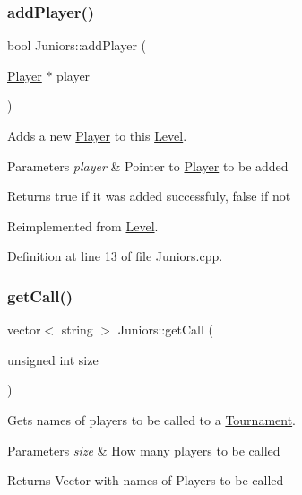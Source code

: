 \subsubsection{\texorpdfstring{add\+Player()}{addPlayer()}}
{\footnotesize\ttfamily bool Juniors\+::add\+Player (\begin{DoxyParamCaption}\item[{\hyperlink{class_player}{Player} $\ast$}]{player }\end{DoxyParamCaption})\hspace{0.3cm}{\ttfamily [virtual]}}



Adds a new \hyperlink{class_player}{Player} to this \hyperlink{class_level}{Level}. 


\begin{DoxyParams}{Parameters}
{\em player} & Pointer to \hyperlink{class_player}{Player} to be added \\
\hline
\end{DoxyParams}
\begin{DoxyReturn}{Returns}
true if it was added successfuly, false if not 
\end{DoxyReturn}


Reimplemented from \hyperlink{class_level_a66290778fa4bcd2f29b9ff3e605b2902}{Level}.



Definition at line 13 of file Juniors.\+cpp.

\hypertarget{class_juniors_ace1da8267f2a92dbfb9e27f7b6b95d26}{}\label{class_juniors_ace1da8267f2a92dbfb9e27f7b6b95d26} 
\subsubsection{\texorpdfstring{get\+Call()}{getCall()}}
{\footnotesize\ttfamily vector$<$ string $>$ Juniors\+::get\+Call (\begin{DoxyParamCaption}\item[{unsigned int}]{size }\end{DoxyParamCaption})\hspace{0.3cm}{\ttfamily [virtual]}}



Gets names of players to be called to a \hyperlink{class_tournament}{Tournament}. 


\begin{DoxyParams}{Parameters}
{\em size} & How many players to be called \\
\hline
\end{DoxyParams}
\begin{DoxyReturn}{Returns}
Vector with names of Players to be called 
\end{DoxyReturn}



